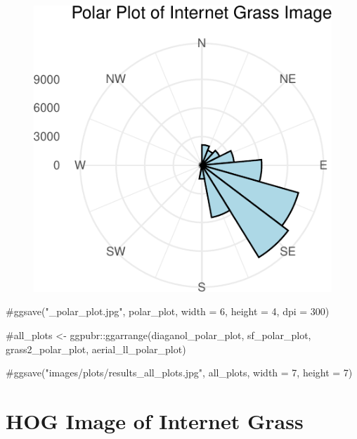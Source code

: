\documentclass[
  letterpaper,
  DIV=11,
  numbers=noendperiod]{scrreprt}
\newenvironment{Shaded}{\begin{snugshade}}{\end{snugshade}}
\newcommand{\CommentTok}[1]{\textcolor[rgb]{0.37,0.37,0.37}{#1}}
\begin{document}
\begin{figure}[H]

{\centering \includegraphics{results_files/figure-pdf/unnamed-chunk-16-9.pdf}

}

\end{figure}

\begin{Shaded}
\begin{Highlighting}[]
\CommentTok{\#ggsave("\_polar\_plot.jpg", polar\_plot, width = 6, height = 4, dpi = 300)}

\CommentTok{\#all\_plots \textless{}{-} ggpubr::ggarrange(diaganol\_polar\_plot, sf\_polar\_plot, grass2\_polar\_plot, aerial\_ll\_polar\_plot)}

\CommentTok{\#ggsave("images/plots/results\_all\_plots.jpg", all\_plots, width = 7, height = 7)}
\end{Highlighting}
\end{Shaded}

\hypertarget{hog-image-of-internet-grass}{%
\section{HOG Image of Internet
Grass}\label{hog-image-of-internet-grass}}
\end{document}
